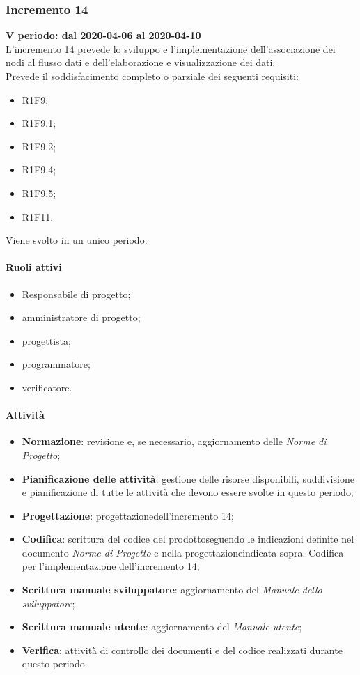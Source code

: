 \subsubsection{Incremento 14}
\textbf{V periodo: dal 2020-04-06 al 2020-04-10} \\
L'incremento 14 prevede lo sviluppo e l'implementazione dell'associazione dei nodi al flusso dati e dell'elaborazione e visualizzazione dei dati.
\\Prevede il soddisfacimento completo o parziale dei seguenti requisiti:
\begin{itemize}
	\item R1F9;
	\item R1F9.1;
	\item R1F9.2;
	\item R1F9.4;
	\item R1F9.5;
	\item R1F11.
\end{itemize}
Viene svolto in un unico periodo.
\paragraph{Ruoli attivi}
\begin{itemize}
	\item Responsabile di progetto\glo;
	\item amministratore di progetto\glo;
	\item progettista;
	\item programmatore;
	\item verificatore.
\end{itemize}
\paragraph{Attività} 
\begin{itemize}
	\item \textbf{Normazione}: revisione e, se necessario, aggiornamento delle \textit{Norme di Progetto};
	\item \textbf{Pianificazione delle attività}: gestione delle risorse disponibili, suddivisione e pianificazione di tutte le attività che devono essere svolte in questo periodo;
	\item \textbf{Progettazione}\glo: progettazione\glosp dell'incremento 14;  
	\item \textbf{Codifica}: scrittura del codice del prodotto\glosp seguendo le indicazioni definite nel documento \textit{Norme di Progetto} e nella progettazione\glosp indicata sopra. Codifica per l'implementazione dell'incremento 14;
	\item \textbf{Scrittura manuale sviluppatore}: aggiornamento del \textit{Manuale dello sviluppatore};
	\item \textbf{Scrittura manuale utente}: aggiornamento del \textit{Manuale utente};
	\item \textbf{Verifica}: attività di controllo dei documenti e del codice realizzati durante questo periodo.
\end{itemize}
